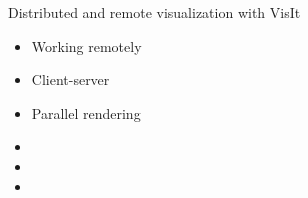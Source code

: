 \begin{frame}{Distributed and remote visualization with VisIt}{}
  \begin{itemize}
  \item Working remotely
  \item Client-server
  \item Parallel rendering
  \item 
  \item 
  \item 
  \end{itemize}
\end{frame}
